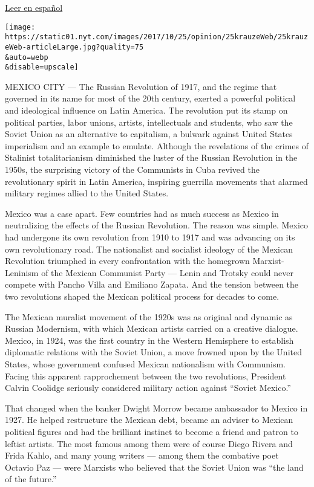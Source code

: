 \href{https://www.nytimes.com/es/2017/10/17/la-revolucion-domesticada}{Leer
en español}

\texttt{[image: https://static01.nyt.com/images/2017/10/25/opinion/25krauzeWeb/25krauzeWeb-articleLarge.jpg?quality=75\\\&auto=webp\\\&disable=upscale]}

MEXICO CITY --- The Russian Revolution of 1917, and the regime that
governed in its name for most of the 20th century, exerted a powerful
political and ideological influence on Latin America. The revolution put
its stamp on political parties, labor unions, artists, intellectuals and
students, who saw the Soviet Union as an alternative to capitalism, a
bulwark against United States imperialism and an example to emulate.
Although the revelations of the crimes of Stalinist totalitarianism
diminished the luster of the Russian Revolution in the 1950s, the
surprising victory of the Communists in Cuba revived the revolutionary
spirit in Latin America, inspiring guerrilla movements that alarmed
military regimes allied to the United States.

Mexico was a case apart. Few countries had as much success as Mexico in
neutralizing the effects of the Russian Revolution. The reason was
simple. Mexico had undergone its own revolution from 1910 to 1917 and
was advancing on its own revolutionary road. The nationalist and
socialist ideology of the Mexican Revolution triumphed in every
confrontation with the homegrown Marxist-Leninism of the Mexican
Communist Party --- Lenin and Trotsky could never compete with Pancho
Villa and Emiliano Zapata. And the tension between the two revolutions
shaped the Mexican political process for decades to come.

The Mexican muralist movement of the 1920s was as original and dynamic
as Russian Modernism, with which Mexican artists carried on a creative
dialogue. Mexico, in 1924, was the first country in the Western
Hemisphere to establish diplomatic relations with the Soviet Union, a
move frowned upon by the United States, whose government confused
Mexican nationalism with Communism. Facing this apparent rapprochement
between the two revolutions, President Calvin Coolidge seriously
considered military action against ``Soviet Mexico.''

That changed when the banker Dwight Morrow became ambassador to Mexico
in 1927. He helped restructure the Mexican debt, became an adviser to
Mexican political figures and had the brilliant instinct to become a
friend and patron to leftist artists. The most famous among them were of
course Diego Rivera and Frida Kahlo, and many young writers --- among
them the combative poet Octavio Paz --- were Marxists who believed that
the Soviet Union was ``the land of the future.''

